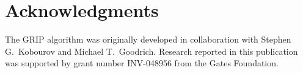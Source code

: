 \documentclass[11pt,twocolumn]{article}
\begin{document}
\section*{Acknowledgments}

The GRIP algorithm was originally developed in collaboration with
Stephen G.\ Kobourov and Michael T.\ Goodrich.  Research reported in
this publication was supported by grant number INV-048956 from the Gates
Foundation.




\end{document}
